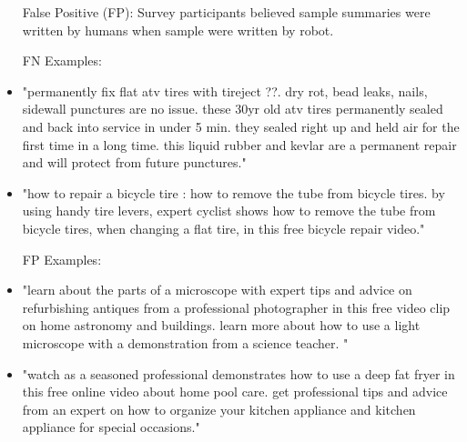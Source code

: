 \documentclass[sigconf]{acmart}
\begin{document}
\begin{itemize}
False Positive (FP): Survey participants believed sample summaries were written by humans when sample were written by robot.

FN Examples: 

\item "permanently fix flat atv tires with tireject ??. dry rot, bead leaks, nails, sidewall punctures are no issue. these 30yr old atv tires permanently sealed and back into service in under 5 min. they sealed right up and held air for the first time in a long time. this liquid rubber and kevlar are a permanent repair and will protect from future punctures."

\item "how to repair a bicycle tire : how to remove the tube from bicycle tires. by using handy tire levers, expert cyclist shows how to remove the tube from bicycle tires, when changing a flat tire, in this free bicycle repair video."

FP Examples:

\item "learn about the parts of a microscope with expert tips and advice on refurbishing antiques from a professional photographer in this free video clip on home astronomy and buildings. learn more about how to use a light microscope with a demonstration from a science teacher. "

\item "watch as a seasoned professional demonstrates how to use a deep fat fryer in this free online video about home pool care. get professional tips and advice from an expert on how to organize your kitchen appliance and kitchen appliance for special occasions."

\end{itemize}
\end{document}
